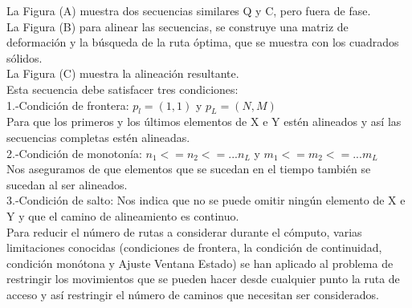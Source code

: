 La Figura (A) muestra dos secuencias similares Q y C, pero fuera de fase.\\
La Figura (B) para alinear las secuencias, se construye una matriz de deformación y la búsqueda de la ruta óptima, que se muestra con los cuadrados sólidos.\\
La Figura (C) muestra la alineación resultante.\\

Esta secuencia debe satisfacer tres condiciones:\\

1.-Condición de frontera: $p_l=(1,1)$ y $p_L=(N,M)$\\
   Para que los primeros  y los últimos elementos de X e Y estén alineados y así las secuencias completas estén alineadas.\\
   
2.-Condición de monotonía:  $n_1<= n_2<=...n_L $ y $ m_1 <= m_2 <= ... m_L$ \\
   Nos aseguramos de que elementos que se sucedan en el tiempo también se sucedan al ser alineados.\\
   
3.-Condición de salto: Nos indica que no se puede omitir ningún elemento de X e Y y que el camino de alineamiento es continuo.\\

Para reducir el número de rutas a considerar durante el cómputo, varias limitaciones conocidas (condiciones de frontera, la condición de continuidad, condición monótona y Ajuste Ventana Estado) se han aplicado al problema de restringir los movimientos que se pueden hacer desde cualquier punto la ruta de acceso y así restringir el número de caminos que necesitan ser considerados.\\

\clearpage

